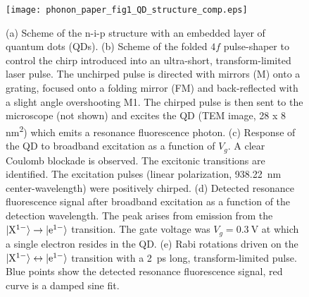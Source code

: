 \documentclass[aps,prl,reprint,superscriptaddress]{revtex4-1}
\begin{document}
\begin{figure}[t]{}
	\centering
	\texttt{[image: phonon\_paper\_fig1\_QD\_structure\_comp.eps]}
	\caption{(a) Scheme of the n-i-p structure with an embedded layer of quantum dots (QDs).
	(b) Scheme of the folded $4f$ pulse-shaper to control the chirp introduced into an ultra-short, transform-limited laser pulse. The unchirped pulse is directed with mirrors (M) onto a grating, focused onto a folding mirror (FM) and back-reflected with a slight angle overshooting M1. The chirped pulse is then sent to the microscope (not shown) and excites the QD (TEM image, 28 x 8 \si{\nano\meter\squared}) which emits a resonance fluorescence photon.
	(c) Response of the QD to broadband excitation as a function of $V_g$. A clear Coulomb blockade is observed. The excitonic transitions are identified. 	The excitation pulses (linear polarization, \SI{938.22}{\nano\meter} center-wavelength) were positively chirped.
	(d) Detected resonance fluorescence signal after broadband excitation as a function of the detection wavelength. The peak arises from emission from the $\ket{\mathrm{X}^{1-}}\rightarrow\ket{\mathrm{e}^{1-}}$ transition. The gate voltage was $V_g=\SI{0.3}{\volt}$ at which a single electron resides in the QD.
	(e) Rabi rotations driven on the $\ket{\mathrm{X}^{1-}}\leftrightarrow\ket{\mathrm{e}^{1-}}$ transition with a \SI{2}{\pico\second} long, transform-limited pulse. Blue points show the detected resonance fluorescence signal, red curve is a damped sine fit.
	}
	\label{fig:scheme}
\end{figure}
\end{document}

